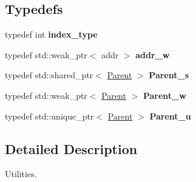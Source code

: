\subsection*{Typedefs}
\begin{DoxyCompactItemize}
\item 
\hypertarget{namespaceNeb_1_1Actor_1_1Util_a22be593087f736e24fab42999719efa4}{typedef int {\bfseries index\-\_\-type}}\label{namespaceNeb_1_1Actor_1_1Util_a22be593087f736e24fab42999719efa4}

\item 
\hypertarget{namespaceNeb_1_1Actor_1_1Util_ac3d8a485cfe35818da67a8f674df7b97}{typedef std\-::weak\-\_\-ptr$<$ addr $>$ {\bfseries addr\-\_\-w}}\label{namespaceNeb_1_1Actor_1_1Util_ac3d8a485cfe35818da67a8f674df7b97}

\item 
\hypertarget{namespaceNeb_1_1Actor_1_1Util_afbe934c5a1a06c6550c444f3cbf28030}{typedef std\-::shared\-\_\-ptr$<$ \hyperlink{classNeb_1_1Actor_1_1Util_1_1Parent}{Parent} $>$ {\bfseries Parent\-\_\-s}}\label{namespaceNeb_1_1Actor_1_1Util_afbe934c5a1a06c6550c444f3cbf28030}

\item 
\hypertarget{namespaceNeb_1_1Actor_1_1Util_af4feac06a284dda47dfff353ec2d8954}{typedef std\-::weak\-\_\-ptr$<$ \hyperlink{classNeb_1_1Actor_1_1Util_1_1Parent}{Parent} $>$ {\bfseries Parent\-\_\-w}}\label{namespaceNeb_1_1Actor_1_1Util_af4feac06a284dda47dfff353ec2d8954}

\item 
\hypertarget{namespaceNeb_1_1Actor_1_1Util_aa630ce01b452da0c15c1f13deba9e3ed}{typedef std\-::unique\-\_\-ptr$<$ \hyperlink{classNeb_1_1Actor_1_1Util_1_1Parent}{Parent} $>$ {\bfseries Parent\-\_\-u}}\label{namespaceNeb_1_1Actor_1_1Util_aa630ce01b452da0c15c1f13deba9e3ed}

\end{DoxyCompactItemize}


\subsection{Detailed Description}
Utilities. 